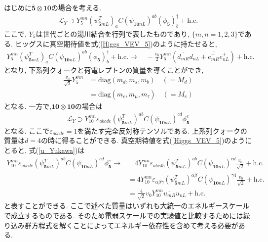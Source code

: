 はじめに$\overline{\bm{5}}\otimes {\bm{10}}$の場合を考える.
\begin{align}
  \mathcal{L}_Y \supset Y_5^{mn} (\psi^T_{\bm{\overline{5}}mL})_a C (\psi_{\bm{10}nL})^{ab}(\phi_{\bm{5}})_b^\dagger +\mathrm{h.c.}\label{yukawa_5_10}
\end{align}
ここで, $Y_5$は世代ごとの湯川結合を行列で表したものであり, $\{m, n= 1,2,3\}$である.
ヒッグスに真空期待値を式(\ref{Higgs_VEV_5})のように持たせると,
\begin{align}
  Y_5^{mn} (\psi^T_{\bm{\overline{5}}mL})_a C (\psi_{\bm{10}nL})^{ab}(\phi_{\bm{5}})_b^\dagger +\mathrm{h.c.} \rightarrow\quad -\frac{v_0}{2}Y_5^{mn}\left(\overline{d_{mR}}d_{nL} + \overline{e_{mR}^+}e^+_{nL}\right) + \mathrm{h.c.}
\end{align}
となり, 下系列クォークと荷電レプトンの質量を導くことができ, 
\begin{align}
  \frac{v_0}{\sqrt{2}}Y_5^{mn} &= \mathrm{diag}(m_d, m_s, m_b)\quad (= M_d)\nonumber\\
                               &= \mathrm{diag}(m_e, m_\mu, m_\tau)\quad (= M_e)
\end{align}
となる.
一方で,$ \bm{10}\otimes \bm{10}$の場合は
\begin{align}
  \mathcal{L}_Y \supset Y_{10}^{mn} \varepsilon_{abcde} (\psi^{T}_{\bm{\overline{5}}mL})^{ab}C (\psi_{\bm{10}nL})^{cd} \phi_{\bm{5}}^e \label{u_Yukawa}
\end{align}
となる.
ここで$\varepsilon_{abcde}=1$を満たす完全反対称テンソルである.
上系列クォークの質量は$d=4$の時に得ることができる.
真空期待値を式(\ref{Higgs_VEV_5})のようにとると, 式(\ref{u_Yukawa})は
\begin{align}
  Y_{10}^{mn} \varepsilon_{abcde} (\psi^{T}_{\bm{\overline{5}}mL})^{ab}C (\psi_{\bm{10}nL})^{cd} \phi_{\bm{5}}^e \rightarrow&\quad 4Y_{10}^{mn} \varepsilon_{abc45} (\psi^{T}_{\bm{\overline{5}}mL})^{ab}C (\psi_{\bm{10}nL})^{cd}\frac{v_0}{\sqrt{2}} + \mathrm{h.c.} \nonumber\\
                                                                                                                            &= 4Y_{10}^{mn} \varepsilon_{\alpha \beta \gamma} (\psi^{T}_{\bm{\overline{5}}mL})^{\alpha\beta}C (\psi_{\bm{10}nL})^{\gamma 4}\frac{v_0}{\sqrt{2}} + \mathrm{h.c.}\nonumber\\
                                                                                                                            &= \frac{4}{\sqrt{2}}v_0 Y_{10}^{mn}\overline{u_{mR}}u_{nL} + \mathrm{h.c.}
\end{align}
と表すことができる.
ここで述べた質量はいずれも大統一のエネルギースケールで成立するものである.
そのため電弱スケールでの実験値と比較するためには繰り込み群方程式を解くことによってエネルギー依存性を含めて考える必要がある.
